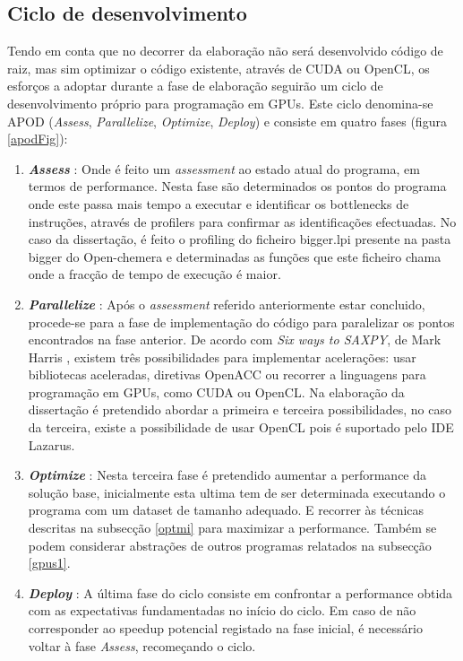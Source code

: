 \subsection{Ciclo de desenvolvimento}
Tendo em conta que no decorrer da elaboração não será desenvolvido código de raiz, mas sim optimizar o código existente, através de CUDA ou OpenCL, os esforços a adoptar durante a fase de elaboração seguirão um ciclo de desenvolvimento próprio para programação em GPUs. Este ciclo denomina-se APOD (\textit{Assess}, \textit{Parallelize}, \textit{Optimize}, \textit{Deploy}) \cite{cudaProgGuide} e consiste em quatro fases (figura \ref{apodFig}):
\begin{enumerate}
\item {\textbf{\textit{Assess}}} : Onde é feito um \textit{assessment} ao estado atual do programa, em termos de performance. Nesta fase são determinados os pontos do programa onde este passa mais tempo a executar e identificar os bottlenecks de instruções, através de profilers para confirmar as identificações efectuadas. No caso da dissertação, é feito o profiling do ficheiro bigger.lpi presente na pasta bigger do Open-chemera e determinadas as funções que este ficheiro chama onde a fracção de tempo de execução é maior. 

\item{\textbf{\textit{ Parallelize}}} : Após o \textit{assessment}  referido anteriormente estar concluido, procede-se para a fase de implementação do código para paralelizar os pontos encontrados na fase anterior. De acordo com \textit{Six ways to SAXPY}, de Mark Harris \cite{saxpy}, existem três possibilidades para implementar acelerações: usar bibliotecas aceleradas, diretivas OpenACC ou recorrer a linguagens para programação em GPUs, como CUDA ou OpenCL. Na elaboração da dissertação é pretendido abordar a primeira e terceira possibilidades, no caso da terceira, existe a possibilidade de usar OpenCL pois é suportado pelo IDE Lazarus.

\item{\textbf{\textit{Optimize}}} : Nesta terceira fase é pretendido aumentar a performance da solução base, inicialmente esta ultima tem de ser determinada executando o programa com um dataset de tamanho adequado. E recorrer às técnicas descritas na subsecção \ref{optmi} para maximizar a performance. Também se podem considerar abstrações de outros programas relatados na subsecção \ref{gpus1}.

\item{\textbf{\textit{Deploy}}} : A última fase do ciclo consiste em confrontar a performance obtida com as expectativas fundamentadas no início do ciclo. Em caso de não corresponder ao speedup potencial registado na fase inicial, é necessário voltar à fase \textit{Assess}, recomeçando o ciclo.
\end{enumerate}

